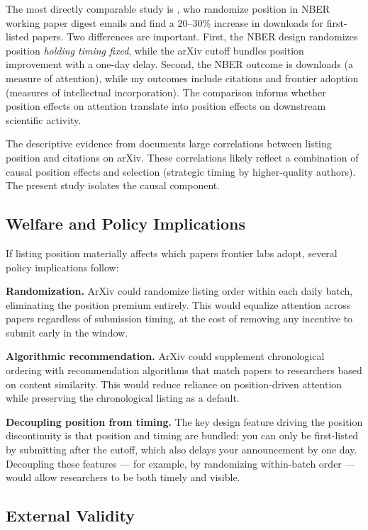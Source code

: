 \documentclass[12pt]{article}
\begin{document}
The most directly comparable study is \citet{feenberg2017}, who randomize position in NBER working paper digest emails and find a 20--30\% increase in downloads for first-listed papers. Two differences are important. First, the NBER design randomizes position \textit{holding timing fixed}, while the arXiv cutoff bundles position improvement with a one-day delay. Second, the NBER outcome is downloads (a measure of attention), while my outcomes include citations and frontier adoption (measures of intellectual incorporation). The comparison informs whether position effects on attention translate into position effects on downstream scientific activity.

The descriptive evidence from \citet{haque2009, haque2010} documents large correlations between listing position and citations on arXiv. These correlations likely reflect a combination of causal position effects and selection (strategic timing by higher-quality authors). The present study isolates the causal component.

\subsection{Welfare and Policy Implications}

If listing position materially affects which papers frontier labs adopt, several policy implications follow:

\textbf{Randomization.} ArXiv could randomize listing order within each daily batch, eliminating the position premium entirely. This would equalize attention across papers regardless of submission timing, at the cost of removing any incentive to submit early in the window.

\textbf{Algorithmic recommendation.} ArXiv could supplement chronological ordering with recommendation algorithms that match papers to researchers based on content similarity. This would reduce reliance on position-driven attention while preserving the chronological listing as a default.

\textbf{Decoupling position from timing.} The key design feature driving the position discontinuity is that position and timing are bundled: you can only be first-listed by submitting after the cutoff, which also delays your announcement by one day. Decoupling these features --- for example, by randomizing within-batch order --- would allow researchers to be both timely and visible.

\subsection{External Validity}
\end{document}

